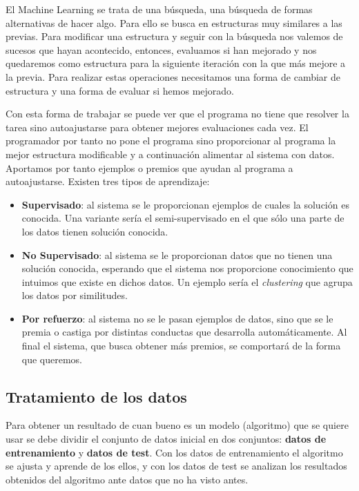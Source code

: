 El Machine Learning se trata de una búsqueda, una búsqueda de formas alternativas de hacer algo. Para ello se busca en estructuras muy similares a las previas. Para modificar una estructura y seguir con la búsqueda nos valemos de sucesos que hayan acontecido, entonces, evaluamos si han mejorado y nos quedaremos como estructura para la siguiente iteración con la que más mejore a la previa. Para realizar estas operaciones necesitamos una forma de cambiar de estructura y una forma de evaluar si hemos mejorado.

Con esta forma de trabajar se puede ver que el programa no tiene que resolver la tarea sino autoajustarse para obtener mejores evaluaciones cada vez. El programador por tanto no pone el programa sino proporcionar al programa la mejor estructura modificable y a continuación alimentar al sistema con datos. Aportamos por tanto ejemplos o premios que ayudan al programa a autoajustarse. Existen tres tipos de aprendizaje: 

\begin{itemize}
    \item \textbf{Supervisado}: al sistema se le proporcionan ejemplos de cuales la solución es conocida. Una variante sería el semi-supervisado en el que sólo una parte de los datos tienen solución conocida.
    \item \textbf{No Supervisado}: al sistema se le proporcionan datos que no tienen una solución conocida, esperando que el sistema nos proporcione conocimiento que intuimos que existe en dichos datos. Un ejemplo sería el \textit{clustering} que agrupa los datos por similitudes.
    \item \textbf{Por refuerzo}: al sistema no se le pasan ejemplos de datos, sino que se le premia o castiga por distintas conductas que desarrolla automáticamente. Al final el sistema, que busca obtener más premios, se comportará de la forma que queremos.
\end{itemize}

\subsection{Tratamiento de los datos}

Para obtener un resultado de cuan bueno es un modelo (algoritmo) que se quiere usar se debe dividir el conjunto de datos inicial en dos conjuntos: \textbf{datos de entrenamiento} y \textbf{datos de test}. Con los datos de entrenamiento el algoritmo se ajusta y aprende de los ellos, y con los datos de test se analizan los resultados obtenidos del algoritmo ante datos que no ha visto antes.

